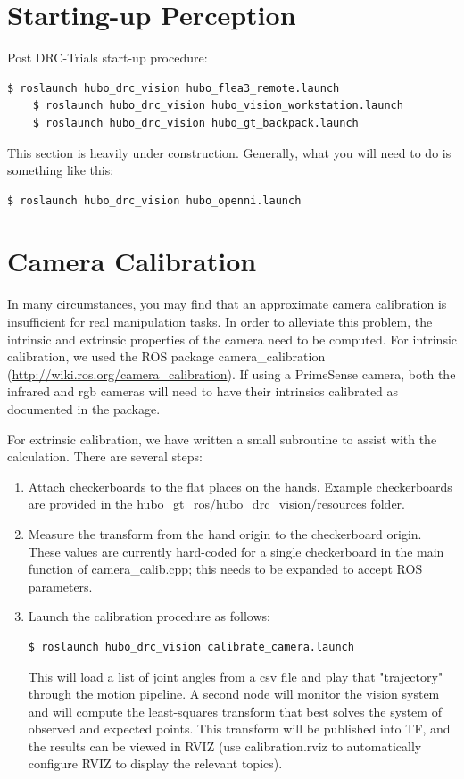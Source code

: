 \documentclass[letterpaper, 10 pt]{report}
\begin{document}
\section{Starting-up Perception} \label{sec:starting-up-perception}
Post DRC-Trials start-up procedure:
  \begin{lstlisting}[language=bash]
    $ roslaunch hubo_drc_vision hubo_flea3_remote.launch
    $ roslaunch hubo_drc_vision hubo_vision_workstation.launch
    $ roslaunch hubo_drc_vision hubo_gt_backpack.launch
  \end{lstlisting}

This section is heavily under construction. Generally, what you will need to do is something like this:
  \begin{lstlisting}[language=bash]
    $ roslaunch hubo_drc_vision hubo_openni.launch
  \end{lstlisting}
  
\pagebreak
\section{Camera Calibration} \label{sec:calibration}
In many circumstances, you may find that an approximate camera calibration is insufficient for real manipulation tasks.
In order to alleviate this problem, the intrinsic and extrinsic properties of the camera need to be computed.
For intrinsic calibration, we used the ROS package camera\_calibration (\url{http://wiki.ros.org/camera_calibration}). If using a PrimeSense camera, both the infrared and rgb cameras will need to have their intrinsics calibrated as documented in the package.

For extrinsic calibration, we have written a small subroutine to assist with the calculation.
There are several steps:
\begin{enumerate}
  \item Attach checkerboards to the flat places on the hands. Example checkerboards are provided in the hubo\_gt\_ros/hubo\_drc\_vision/resources folder.
  \item Measure the transform from the hand origin to the checkerboard origin. These values are currently hard-coded for a single checkerboard in the main function of camera\_calib.cpp; this needs to be expanded to accept ROS parameters.
  \item Launch the calibration procedure as follows:
  \begin{lstlisting}[language=bash]
    $ roslaunch hubo_drc_vision calibrate_camera.launch
  \end{lstlisting}
  This will load a list of joint angles from a csv file and play that "trajectory" through the motion pipeline. A second node will monitor the vision system and will compute the least-squares transform that best solves the system of observed and expected points. This transform will be published into TF, and the results can be viewed in RVIZ (use calibration.rviz to automatically configure RVIZ to display the relevant topics).
\end{enumerate}
\end{document}
